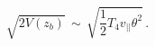 \begin{equation}
\sqrt{2V(z_{b})} \, \sim \, \sqrt{\frac{1}{2}T_{4}v_{||}\theta^{2}} \, .
\end{equation}


